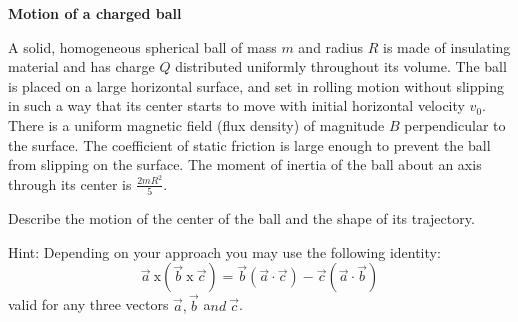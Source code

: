 \textbf{Motion of a charged ball}

A solid, homogeneous spherical ball of mass $m$ and radius $R$ is made of insulating material and has charge $Q$ distributed uniformly throughout its volume. The ball is placed on a large horizontal surface, and set in rolling motion without slipping in such a way that its center starts to move with initial horizontal velocity $v_0$. There is a uniform magnetic field (flux density) of magnitude $B$ perpendicular to the surface. The coefficient of static friction is large enough to prevent the ball from slipping on the surface. The moment of inertia of the ball about an axis through its center is $\frac{2mR^2}{5}$.

Describe the motion of the center of the ball and the shape of its trajectory.

Hint: Depending on your approach you may use the following identity:
\[
\vec{a}\ \mathrm{x}\left(\vec{b}\ \mathrm{x}\ \vec{c}\right)=\vec{b}\left(\vec{a}\cdot\vec{c}\right)-\vec{c}\left(\vec{a}\cdot\vec{b}\right)
\]
valid for any three vectors $\vec{a},\vec{b}$ a$nd\ \vec{c}$.
